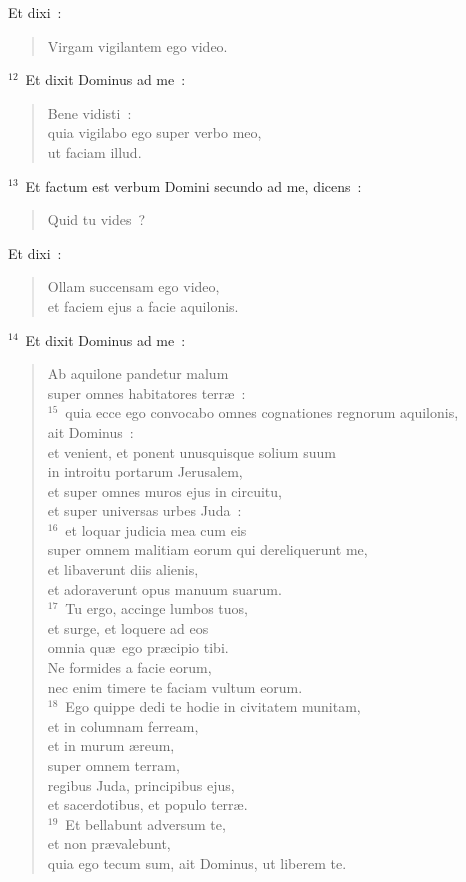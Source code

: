  Et dixi~: \begin{verse}Virgam vigilantem ego video.\end{verse}


${}^{12}$~Et dixit Dominus ad me~: \begin{verse}Bene vidisti~:\\ quia vigilabo ego super verbo meo,\\ ut faciam illud.\end{verse}


${}^{13}$~Et factum est verbum Domini secundo ad me, dicens~: \begin{verse}Quid tu vides~?\end{verse}

 Et dixi~: \begin{verse}Ollam succensam ego video,\\ et faciem ejus a facie aquilonis.\end{verse}


${}^{14}$~Et dixit Dominus ad me~: \begin{verse}Ab aquilone pandetur malum\\ super omnes habitatores terr\ae~:\\
${}^{15}$~quia ecce ego convocabo omnes cognationes regnorum aquilonis,\\ ait Dominus~:\\ et venient, et ponent unusquisque solium suum\\ in introitu portarum Jerusalem,\\ et super omnes muros ejus in circuitu,\\ et super universas urbes Juda~:\\
${}^{16}$~et loquar judicia mea cum eis\\ super omnem malitiam eorum qui dereliquerunt me,\\ et libaverunt diis alienis,\\ et adoraverunt opus manuum suarum.\\
${}^{17}$~Tu ergo, accinge lumbos tuos,\\ et surge, et loquere ad eos\\ omnia qu\ae\ ego pr\ae cipio tibi.\\ Ne formides a facie eorum,\\ nec enim timere te faciam vultum eorum.\\
${}^{18}$~Ego quippe dedi te hodie in civitatem munitam,\\ et in columnam ferream,\\ et in murum \ae reum,\\ super omnem terram,\\ regibus Juda, principibus ejus,\\ et sacerdotibus, et populo terr\ae .\\
${}^{19}$~Et bellabunt adversum te,\\ et non pr\ae valebunt,\\ quia ego tecum sum, ait Dominus, ut liberem te.\end{verse}



